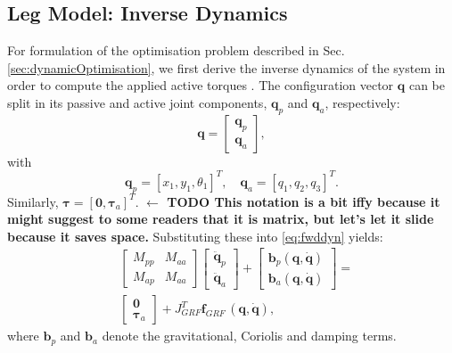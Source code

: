 \documentclass[letterpaper, 10 pt, conference]{ieeeconf}  %
\begin{document}
\subsection{Leg Model: Inverse Dynamics}
For formulation of the optimisation problem described in Sec. \ref{sec:dynamicOptimisation}, we first derive the inverse dynamics of the system in order to compute the applied active torques \cite{nakanishi2007inverse}. The configuration vector $\mathbf{q}$ can be split in its passive and active joint components, $\mathbf{q}_p$ and $\mathbf{q}_a$, respectively:
\begin{equation}
\mathbf{q} =
\begin{bmatrix}
	\mathbf{q}_p \\
	\mathbf{q}_a
\end{bmatrix},
\end{equation}
with
\begin{equation}
\mathbf{q}_p = [x_1,y_1,\theta_1]^T, \quad  
\mathbf{q}_a = [q_1,q_2,q_3]^T.
\end{equation}
\noindent
Similarly, $\boldsymbol{\tau} = \left[\mathbf{0},\boldsymbol{\tau}_a\right]^T$. \textbf{$\leftarrow$ TODO This notation is a bit iffy because it might suggest to some readers that it is matrix, but let's let it slide because it saves space.}
Substituting these into \eqref{eq:fwddyn} yields:
\begin{equation}
\begin{aligned}
&\left[\begin{array}{cc}  
M_{pp} & M_{aa}\\
M_{ap} & M_{aa}
\end{array} \right]
\left[\begin{array}{c}  
\mathbf{\ddot q}_p\\
\mathbf{\ddot q}_a
\end{array} \right] +
\left[\begin{array}{c}  
\mathbf{b}_p \mathbf{(q,\dot q)}\\
\mathbf{b}_a \mathbf{(q,\dot q)}
\end{array} \right] 
=\\
&\left[\begin{array}{c}  
\mathbf{0}\\
\boldsymbol{\tau}_a
\end{array} \right] 
+
J_{GRF}^T \mathbf{f}_{GRF} \, \mathbf{(q, \dot q)},
\end{aligned}
\label{eq:ik}
\end{equation}		
where $\mathbf{b}_p$ and $\mathbf{b}_a$ denote the gravitational, Coriolis and damping terms. 
\end{document}
